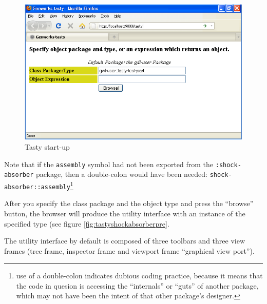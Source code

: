 \documentclass [11pt]{book}
\begin{document}
\begin{figure}
\begin{center}
\includegraphics{../images/tasty-start.png}
\end{center}

\caption{Tasty start-up}

\label{fig:tasty-startup}

\end{figure}


Note that if the \texttt{assembly} symbol had not been exported from the \texttt{:shock-absorber} package, then a double-colon would have been needed: \texttt{shock-absorber::assembly}\footnote{use of a double-colon indicates dubious coding
practice, because it means that the code in quesion is accessing the
``internals'' or ``guts'' of another package, which may not have been
the intent of that other package's designer.}



After you specify the class package and the object type and press the
``browse'' button, the browser will produce the utility interface
with an instance of the specified type (see figure 
\ref{fig:tastyshockabsorberpre}.



The utility interface by default is composed of three toolbars and
three view frames (tree frame, inspector frame and viewport frame
``graphical view port'').
\end{document}
